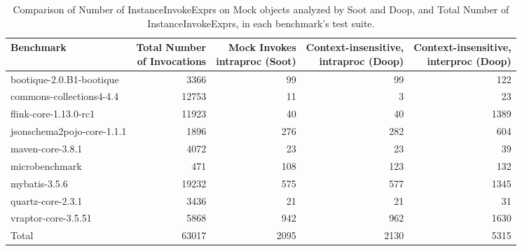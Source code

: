 \begin{table*}
	\centering
	\caption{Comparison of Number of InstanceInvokeExprs on Mock objects analyzed by Soot and Doop, \hspace{\textwidth}and Total Number of InstanceInvokeExprs, in each benchmark's test suite.}
	\begin{tabular}{lrrrr}
		\toprule
		Benchmark & \thead{Total Number \\ of Invocations} & \thead{Mock Invokes \\ intraproc (Soot)}  & \thead{Context-insensitive, \\ intraproc (Doop)} &\thead{Context-insensitive, \\ interproc (Doop)} \\
		\midrule
		bootique-2.0.B1-bootique           		&  3366     &  99  & 99   & 122    \\
		commons-collections4-4.4       			&  12753    &  11   &  3   & 23   \\
		flink-core-1.13.0-rc1           		&  11923    &  40   & 40   & 1389   \\
		jsonschema2pojo-core-1.1.1      	     	&  1896     &  276  & 282  & 604   \\
		maven-core-3.8.1           			&  4072     &  23   & 23   & 39  \\
		microbenchmark         		  		&  471      &  108  & 123  & 132   \\
		mybatis-3.5.6         		  		&  19232    &  575  & 577  & 1345     \\
		quartz-core-2.3.1       	  		&  3436     &  21   & 21   & 31    \\
		vraptor-core-3.5.51        	  		&  5868     &  942  & 962  & 1630   \\
		\bottomrule
		Total        	  				&  63017    & 2095  & 2130  & 5315   \\
	\end{tabular}
	\label{tab:invokes}
\end{table*}

